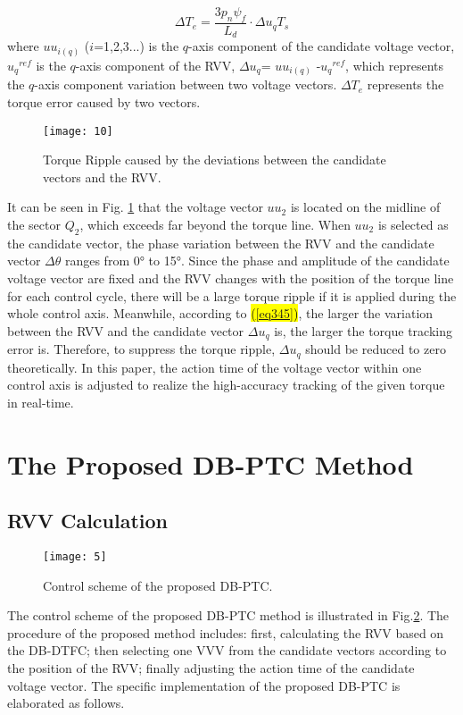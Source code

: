 \documentclass[sn-basic]{sn-jnl}
\theoremstyle{thmstyleone}%
\theoremstyle{thmstyletwo}%
\theoremstyle{thmstylethree}%
\theoremstyle{thmstyleone}%
\begin{document}
\begin{equation}\label{eq345}
\Delta T_{e} = \frac{3p_{n}\psi_{f}}{L_{d}} \cdot \Delta u_{q}T_{s}
\end{equation}
where ${uu}_{i(q)}$ (${i}$=1,2,3...) is the $q$-axis component of the candidate voltage vector, ${u_q}^{ref}$ is the $q$-axis component of the RVV, ${\Delta u}_q$= ${uu}_{i(q)}$ -${u_q}^{ref}$, which represents the $q$-axis component variation between two voltage vectors. ${\Delta T}_e$ represents the torque error caused by two vectors. 

\begin{figure}[h]
\centering
\texttt{[image: 10]}
\caption{Torque Ripple caused by the deviations between the candidate vectors and the RVV.}
\label{fig_5}
\end{figure}

It can be seen in Fig. \ref{fig_5} that the voltage vector ${uu}_2$ is located on the midline of the sector $Q_2$, which exceeds far beyond the torque line. When ${uu}_2$ is selected as the candidate vector, the phase variation between the RVV and the candidate vector ${\Delta}{\theta}$ ranges from 0° to 15°. Since the phase and amplitude of the candidate voltage vector are fixed and the RVV changes with the position of the torque line for each control cycle, there will be a large torque ripple if it is applied during the whole control axis. Meanwhile, according to \hl{{(\ref{eq345})}}, the larger the variation between the RVV and the candidate vector ${\Delta}{u}_q$ is, the larger the torque tracking error is. Therefore, to suppress the torque ripple, ${{\Delta}u}_q$ should be reduced to zero theoretically. In this paper, the action time of the voltage vector within one control axis is adjusted to realize the high-accuracy tracking of the given torque in real-time.

\section{The Proposed DB-PTC Method}\label{sec4}

\subsection{RVV Calculation}
\begin{figure}[h]
\centering
\texttt{[image: 5]}
\caption{Control scheme of the proposed DB-PTC.}
\label{fig_6}
\end{figure}


The control scheme of the proposed DB-PTC method is illustrated in Fig.\ref{fig_6}. The procedure of the proposed method includes: first, calculating the RVV based on the DB-DTFC; then selecting one VVV from the candidate vectors according to the position of the RVV; finally adjusting the action time of the candidate voltage vector. The specific implementation of the proposed DB-PTC is elaborated as follows.
\end{document}
